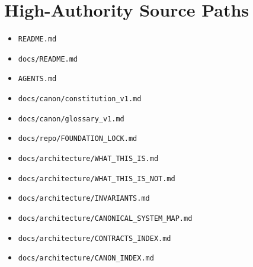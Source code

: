 \documentclass[10.5pt,a4paper,openany]{book}
\begin{document}
\section{High-Authority Source Paths}

\begin{itemize}
\item \texttt{README.\allowbreak{}md}
\item \texttt{docs/\allowbreak{}README.\allowbreak{}md}
\item \texttt{AGENTS.\allowbreak{}md}
\item \texttt{docs/\allowbreak{}canon/\allowbreak{}constitution\_\allowbreak{}v1.\allowbreak{}md}
\item \texttt{docs/\allowbreak{}canon/\allowbreak{}glossary\_\allowbreak{}v1.\allowbreak{}md}
\item \texttt{docs/\allowbreak{}repo/\allowbreak{}FOUNDATION\_\allowbreak{}LOCK.\allowbreak{}md}
\item \texttt{docs/\allowbreak{}architecture/\allowbreak{}WHAT\_\allowbreak{}THIS\_\allowbreak{}IS.\allowbreak{}md}
\item \texttt{docs/\allowbreak{}architecture/\allowbreak{}WHAT\_\allowbreak{}THIS\_\allowbreak{}IS\_\allowbreak{}NOT.\allowbreak{}md}
\item \texttt{docs/\allowbreak{}architecture/\allowbreak{}INVARIANTS.\allowbreak{}md}
\item \texttt{docs/\allowbreak{}architecture/\allowbreak{}CANONICAL\_\allowbreak{}SYSTEM\_\allowbreak{}MAP.\allowbreak{}md}
\item \texttt{docs/\allowbreak{}architecture/\allowbreak{}CONTRACTS\_\allowbreak{}INDEX.\allowbreak{}md}
\item \texttt{docs/\allowbreak{}architecture/\allowbreak{}CANON\_\allowbreak{}INDEX.\allowbreak{}md}
\end{itemize}
\end{document}
